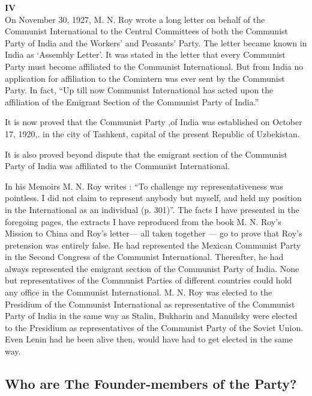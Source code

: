 \textbf{IV}\\

On November 30, 1927, M. N. Roy wrote a long letter on behalf of the Communist International to the Central Committees of both the Communist Party of India and the Workers’ and Peasants’ Party. The letter became known in India as ‘Assembly Letter’. It was stated in the letter that every Communist Party must become affiliated to the Communist International. But from India no application for affiliation to the Comintern was ever sent by the Communist Party. In fact, “Up till now Communist International has acted upon the affiliation of the Emigrant Section of the Communist Party of India.” 

It is now proved that the Communist Party ,of India was established on October 17, 1920,. in the city of Tashkent, capital of the present Republic of Uzbekistan. 

It is also proved beyond dispute that the emigrant section of the Communist Party of India was affiliated to the Communist International. 

In his Memoirs M. N. Roy writes : “To challenge my representativeness was pointless. I did not claim to represent anybody but myself, and held my position in the International as an individual (p. 301)”. The facts I have presented in the foregoing pages, the extracts I have reproduced from the book M. N. Roy’s Mission to China and Roy’s letter— all taken together — go to prove that Roy’s pretension was entirely false. He had represented the Mexican Communist Party in the Second Congress of the Communist International. Thereafter, he had always represented the emigrant section of the Communist Party of India. None but representatives of the Communist Parties of different countries could hold any office in the Communist International. M. N. Roy was elected to the Presidium of the Communist International as representative of the Communist Party of India in the same way as Stalin, Bukharin and Manuilsky were elected to the Presidium as representatives of the Communist Party of the Soviet Union. Even Lenin had he been alive then, would have had to get elected in the same way. 


\subsection{Who are The Founder-members of the Party?} 

